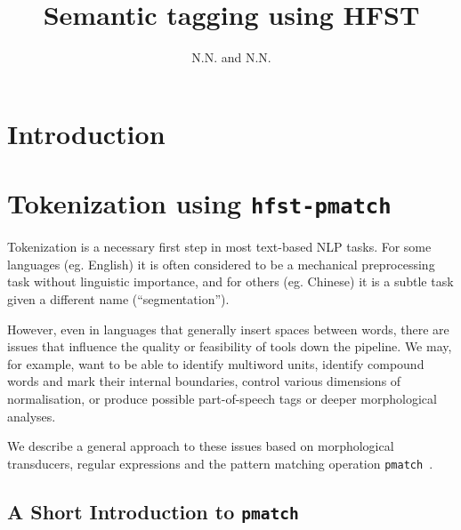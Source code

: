 \documentclass{llncs}
\begin{document}
%
\title{Semantic tagging using HFST}
%
\author{N.N. and N.N.}


\maketitle


\begin{abstract}
\end{abstract}

\section*{Introduction}

\section{Tokenization using {\tt hfst-pmatch}}\label{sec:tokenization}
Tokenization is a necessary first step in most text-based NLP tasks. For some
languages (eg. English) it is often considered to be a mechanical
preprocessing task without linguistic importance, and for others (eg. Chinese)
it is a subtle task given a different name (``segmentation'').

However, even in languages that generally insert spaces between words, there
are issues that influence the quality or feasibility of tools down the
pipeline. We may, for example, want to be able to identify multiword units,
identify compound words and mark their internal boundaries, control various
dimensions of normalisation, or produce possible part-of-speech tags or
deeper morphological analyses.

We describe a general approach to these issues based on morphological
transducers, regular expressions and the pattern matching operation
\verb+pmatch+~\cite{karttunen/2011}.

\subsection{A Short Introduction to {\tt pmatch}}
\end{document}
